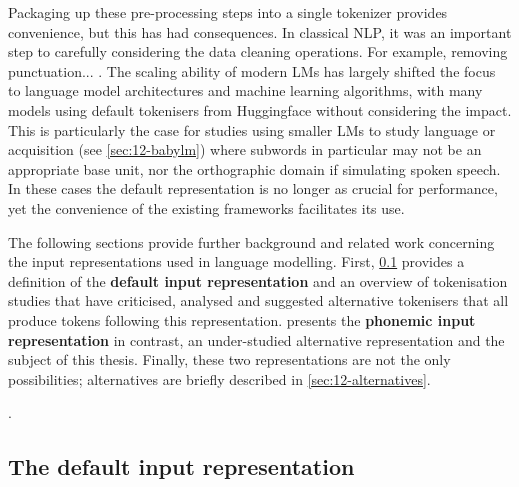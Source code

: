Packaging up these pre-processing steps into a single tokenizer provides convenience, but this has had consequences. In classical NLP, it was an important step to carefully considering the data cleaning operations. For example, removing punctuation... \writemore. The scaling ability of modern LMs has largely shifted the focus to language model architectures and machine learning algorithms, with many models using default tokenisers from Huggingface without considering the impact. This is particularly the case for studies using smaller LMs to study language or acquisition (see \cref{sec:12-babylm}) where subwords in particular may not be an appropriate base unit, nor the orthographic domain if simulating spoken speech. In these cases the default representation is no longer as crucial for performance, yet the convenience of the existing frameworks facilitates its use. 


The following sections provide further background and related work concerning the input representations used in language modelling. First, \cref{sec:12-default} provides a definition of the \textbf{default input representation} and an overview of tokenisation studies that have criticised, analysed and suggested alternative tokenisers that all produce tokens following this representation.  presents the \textbf{phonemic input representation} in contrast, an under-studied alternative representation and the subject of this thesis. Finally, these two representations are not the only possibilities; alternatives are briefly described in \cref{sec:12-alternatives}.

. 

\subsection{The default input representation}\label{sec:12-default}


